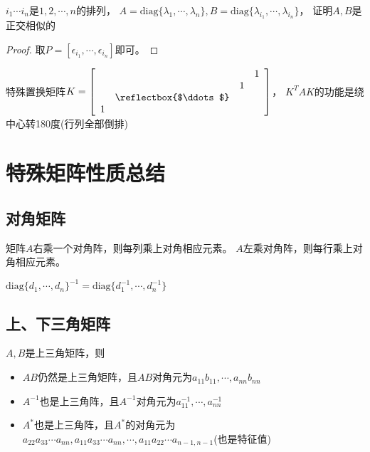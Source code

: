 \begin{exercise}[置换矩阵正交相似例子]
  $i_1 \cdots i_n$是$1,2,\cdots,n$的排列，
  $A = \text{diag}\{\lambda_1,\cdots,\lambda_n\}, B = \text{diag}\{\lambda_{i_1},\cdots,\lambda_{i_n}\}$，
  证明$A,B$是正交相似的
\end{exercise}

\begin{proof}
  取$P = [\epsilon_{i_1},\cdots,\epsilon_{i_n}]$即可。
\end{proof}

\begin{definition}[特殊的置换矩阵]
  特殊置换矩阵$K = \left[
    \begin{array}{cccc}
      &&&1 \\
      &&1& \\
      &\reflectbox{$\ddots$}&& \\
      1&&&
    \end{array}
  \right]$，
  $K^TAK$的功能是绕中心转180度(行列全部倒排)
\end{definition}





\section{特殊矩阵性质总结}

\subsection{对角矩阵}

\begin{theorem}[对角矩阵乘法]
  矩阵$A$右乘一个对角阵，则每列乘上对角相应元素。
  $A$左乘对角阵，则每行乘上对角相应元素。
\end{theorem}

\begin{theorem}[对角矩阵求逆]
  $\text{diag}\{d_1,\cdots,d_n\}^{-1} = \text{diag}\{d_1^{-1},\cdots,d_n^{-1}\}$
\end{theorem}

\subsection{上、下三角矩阵}

\begin{theorem}[上下三角乘法、逆、伴随]
  $A,B$是上三角矩阵，则
  \begin{itemize}
  \item $AB$仍然是上三角矩阵，且$AB$对角元为$a_{11}b_{11},\cdots,a_{nn}b_{nn}$
  \item $A^{-1}$也是上三角阵，且$A^{-1}$对角元为$a_{11}^{-1},\cdots,a_{nn}^{-1}$
  \item $A^{*}$也是上三角阵，且$A^{*}$的对角元为$a_{22}a_{33}\cdots a_{nn},a_{11}a_{33}\cdots a_{nn},\cdots,a_{11}a_{22}\cdots a_{n-1,n-1}$(也是特征值)
  \end{itemize}
\end{theorem}

